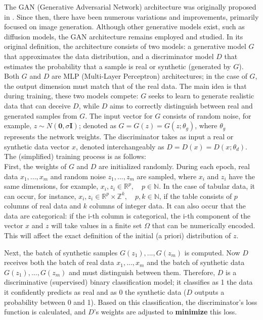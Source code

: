 The GAN (Generative Adversarial Network) architecture was originally proposed in \cite{goodfellow2014}. Since then, there have been numerous variations and improvements, primarily focused on image generation. Although other generative models exist, such as diffusion models, the GAN architecture remains employed and studied. In its original definition, the architecture consists of two models: a generative model $G$ that approximates the data distribution, and a discriminator model $D$ that estimates the probability that a sample is real or synthetic (generated by $G$). Both $G$ and $D$ are MLP (Multi-Layer Perceptron) architectures; in the case of $G$, the output dimension must match that of the real data. The main idea is that during training, these two models compete: $G$ seeks to learn to generate realistic data that can deceive $D$, while $D$ aims to correctly distinguish between real and generated samples from $G$. The input vector for $G$ consists of random noise, for example, $z \sim N(\mathbf{0}, \sigma \mathbf{I})$; denoted as $G = G(z) = G(z; \theta_g)$, where $\theta_g$ represents the network weights. The discriminator takes as input a real or synthetic data vector $x$, denoted interchangeably as $D = D(x) = D(x; \theta_d)$. The (simplified) training process is as follows:\\
First, the weights of $G$ and $D$ are initialized randomly. During each epoch, real data ${x_1,...,x_m}$ and random noise ${z_1,...,z_m}$ are sampled, where $x_i$ and $z_i$ have the same dimensions, for example, $x_i, z_i \in \mathbb{R}^p, \quad p \in \mathbb{N}$. In the case of tabular data, it can occur, for instance, $x_i, z_i \in \mathbb{R}^p \times \mathbb{Z}^k, \quad p,k \in \mathbb{N}$, if the table consists of $p$ columns of real data and $k$ columns of integer data. It can also occur that the data are categorical: if the i-th column is categorical, the i-th component of the vector $x$ and $z$ will take values in a finite set $\Omega$ that can be numerically encoded. This will affect the exact definition of the initial (a priori) distribution of $z$.

Next, the batch of synthetic samples ${G(z_1),...,G(z_m)}$ is computed. Now $D$ receives both the batch of real data ${x_1,...,x_m}$ and the batch of synthetic data ${G(z_1),...,G(z_m)}$ and must distinguish between them. Therefore, $D$ is a discriminative (supervised) binary classification model; it classifies as 1 the data it confidently predicts as real and as 0 the synthetic data ($D$ outputs a probability between 0 and 1). Based on this classification, the discriminator's loss function is calculated, and $D$'s weights are adjusted to \textbf{minimize} this loss.

